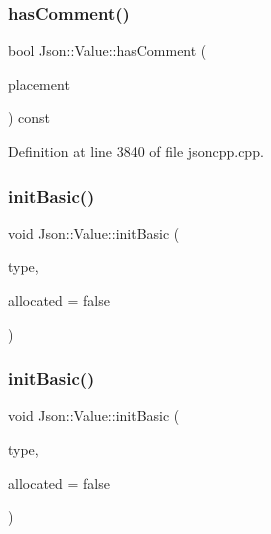 \subsubsection{\texorpdfstring{has\+Comment()}{hasComment()}\hspace{0.1cm}{\footnotesize\ttfamily [2/2]}}
{\footnotesize\ttfamily bool Json\+::\+Value\+::has\+Comment (\begin{DoxyParamCaption}\item[{\hyperlink{namespace_json_a4fc417c23905b2ae9e2c47d197a45351}{Comment\+Placement}}]{placement }\end{DoxyParamCaption}) const}



Definition at line 3840 of file jsoncpp.\+cpp.

\hypertarget{class_json_1_1_value_a32b86b71564157f40f880f5736be822a}{}\label{class_json_1_1_value_a32b86b71564157f40f880f5736be822a} 
\subsubsection{\texorpdfstring{init\+Basic()}{initBasic()}\hspace{0.1cm}{\footnotesize\ttfamily [1/2]}}
{\footnotesize\ttfamily void Json\+::\+Value\+::init\+Basic (\begin{DoxyParamCaption}\item[{\hyperlink{namespace_json_a7d654b75c16a57007925868e38212b4e}{Value\+Type}}]{type,  }\item[{bool}]{allocated = {\ttfamily false} }\end{DoxyParamCaption})\hspace{0.3cm}{\ttfamily [private]}}

\hypertarget{class_json_1_1_value_a32b86b71564157f40f880f5736be822a}{}\label{class_json_1_1_value_a32b86b71564157f40f880f5736be822a} 
\subsubsection{\texorpdfstring{init\+Basic()}{initBasic()}\hspace{0.1cm}{\footnotesize\ttfamily [2/2]}}
{\footnotesize\ttfamily void Json\+::\+Value\+::init\+Basic (\begin{DoxyParamCaption}\item[{\hyperlink{namespace_json_a7d654b75c16a57007925868e38212b4e}{Value\+Type}}]{type,  }\item[{bool}]{allocated = {\ttfamily false} }\end{DoxyParamCaption})\hspace{0.3cm}{\ttfamily [private]}}



